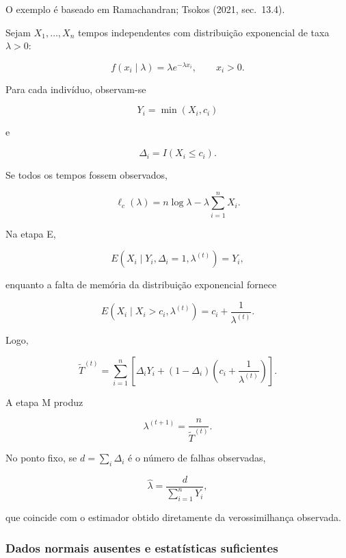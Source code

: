\documentclass[
  letterpaper,
  DIV=11,
  numbers=noendperiod]{scrreprt}
\begin{document}
\begin{tcolorbox}[enhanced jigsaw, colback=white, leftrule=.75mm, colbacktitle=quarto-callout-tip-color!10!white, breakable, titlerule=0mm, bottomtitle=1mm, title=\textcolor{quarto-callout-tip-color}{\faLightbulb}\hspace{0.5em}{Exemplo 3 --- tempos censurados}, colframe=quarto-callout-tip-color-frame, toprule=.15mm, opacityback=0, bottomrule=.15mm, opacitybacktitle=0.6, arc=.35mm, toptitle=1mm, rightrule=.15mm, coltitle=black, left=2mm]

O exemplo é baseado em Ramachandran; Tsokos (2021, sec.~13.4).

\end{tcolorbox}

Sejam \(X_1,\ldots,X_n\) tempos independentes com distribuição
exponencial de taxa \(\lambda>0\):

\[f(x_i\mid\lambda)
=
\lambda e^{-\lambda x_i},
\qquad x_i>0.\]

Para cada indivíduo, observam-se

\[Y_i=\min(X_i,c_i)\]

e

\[\Delta_i=I(X_i\leq c_i).\]

Se todos os tempos fossem observados,

\[\ell_c(\lambda)
=
n\log\lambda
-
\lambda\sum_{i=1}^nX_i.\]

Na etapa E,

\[E(X_i\mid Y_i,\Delta_i=1,\lambda^{(t)})
=Y_i,\]

enquanto a falta de memória da distribuição exponencial fornece

\[E(X_i\mid X_i>c_i,\lambda^{(t)})
=
c_i+\frac{1}{\lambda^{(t)}}.\]

Logo,

\[\widetilde{T}^{(t)}
=
\sum_{i=1}^n
\left[
\Delta_iY_i
+
(1-\Delta_i)
\left(c_i+\frac{1}{\lambda^{(t)}}\right)
\right].\]

A etapa M produz

\[\lambda^{(t+1)}
=
\frac{n}{\widetilde{T}^{(t)}}.\]

No ponto fixo, se \(d=\sum_i\Delta_i\) é o número de falhas observadas,

\[\widehat{\lambda}
=
\frac{d}{\sum_{i=1}^nY_i},\]

que coincide com o estimador obtido diretamente da verossimilhança
observada.

\subsubsection{Dados normais ausentes e estatísticas
suficientes}\label{dados-normais-ausentes-e-estatuxedsticas-suficientes}
\end{document}
